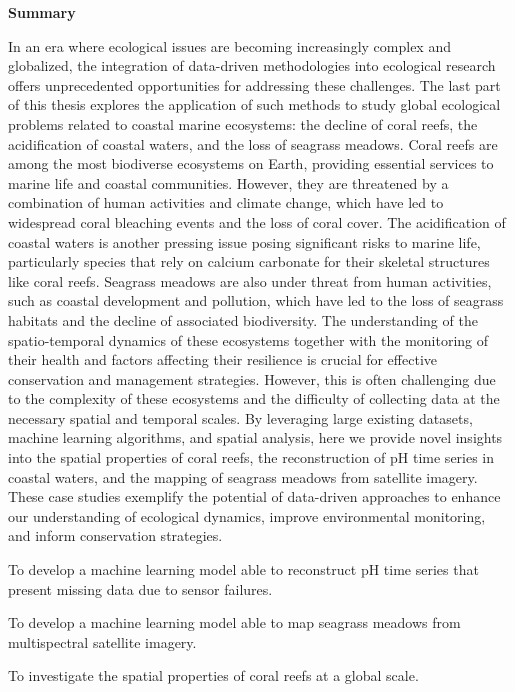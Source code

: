 \thispagestyle{empty}

\begin{center}
    \textbf{\Large Summary}
\end{center}

In an era where ecological issues are becoming increasingly complex and
globalized, the integration of data-driven methodologies into ecological
research offers unprecedented opportunities for addressing these challenges.
The last part of this thesis explores the application of such methods to
study global ecological problems related to coastal marine ecosystems: the
decline of coral reefs, the acidification of coastal waters, and the loss of
seagrass meadows. Coral reefs are among the most biodiverse ecosystems on
Earth, providing essential services to marine life and coastal communities.
However, they are threatened by a combination of human activities and climate
change, which have led to widespread coral bleaching events and the loss of
coral cover. The acidification of coastal waters is another pressing issue
posing significant risks to marine life, particularly species that rely on
calcium carbonate for their skeletal structures like coral reefs. Seagrass
meadows are also under threat from human activities, such as coastal
development and pollution, which have led to the loss of seagrass habitats and
the decline of associated biodiversity. The understanding of the
spatio-temporal dynamics of these ecosystems together with the monitoring of
their health and factors affecting their resilience is crucial for effective
conservation and management strategies. However, this is often challenging due
to the complexity of these ecosystems and the difficulty of collecting data at
the necessary spatial and temporal scales. By leveraging large existing
datasets, machine learning algorithms, and spatial analysis, here we provide
novel insights into the spatial properties of coral reefs, the reconstruction
of pH time series in coastal waters, and the mapping of seagrass meadows from
satellite imagery. These case studies exemplify the potential of data-driven
approaches to enhance our understanding of ecological dynamics, improve
environmental monitoring, and inform conservation strategies.

\vspace{1cm}

\begin{objectiveslist}
    \item To develop a machine learning model able to reconstruct pH
    time series that present missing data due to sensor failures.
    \item To develop a machine learning model able to map seagrass meadows from
    multispectral satellite imagery.
    \item To investigate the spatial properties of coral reefs at a global
    scale.
\end{objectiveslist}

